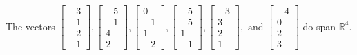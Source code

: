 \begin{exercise}
\begin{exerciseStatement}
  \end{exerciseStatement}
  \begin{exerciseAnswer}
   The vectors \(\left[\begin{array}{r}
-3 \\
-1 \\
-2 \\
-1
\end{array}\right] , \left[\begin{array}{r}
-5 \\
-1 \\
4 \\
2
\end{array}\right] , \left[\begin{array}{r}
0 \\
-1 \\
1 \\
-2
\end{array}\right] , \left[\begin{array}{r}
-5 \\
-5 \\
1 \\
-1
\end{array}\right] , \left[\begin{array}{r}
-3 \\
3 \\
2 \\
1
\end{array}\right] , \text{ and } \left[\begin{array}{r}
-4 \\
0 \\
2 \\
3
\end{array}\right]\) 
  	 do  
	span \(\mathbb{R}^4\).
  


  \end{exerciseAnswer}
\end{exercise}